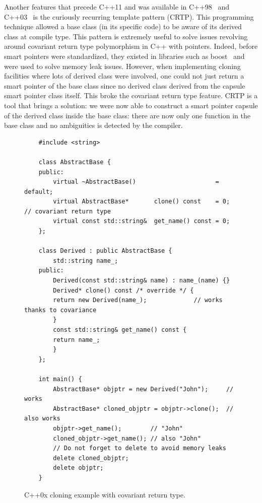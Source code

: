 Another features that precede C++11 and was available in C++98~\parencite{iso.1998.cpp} and
C++03~\parencite{iso.2003.cpp} is the curiously recurring template pattern (CRTP). This programming technique allowed a
base class (in its specific code) to be aware of its derived class at compile type. This pattern is extremely useful to
solve issues revolving around covariant return type polymorphism in C++ with pointers. Indeed, before smart pointers
were standardized, they existed in libraries such as boost~\parencite{boost.2021} and were used to solve memory leak
issues. However, when implementing cloning facilities where lots of derived class were involved, one could not just
return a smart pointer of the base class since no derived class derived from the capsule smart pointer class itself.
This broke the covariant return type feature. CRTP is a tool that brings a solution: we were now able to construct a
smart pointer capsule of the derived class inside the base class: there are now only one function in the base class and
no ambiguities is detected by the compiler.

\begin{figure}[tbh]
  \centering
  \begin{verbatim}
    #include <string>

    class AbstractBase {
    public:
        virtual ~AbstractBase()                      = default;
        virtual AbstractBase*       clone() const    = 0; // covariant return type
        virtual const std::string&  get_name() const = 0;
    };

    class Derived : public AbstractBase {
        std::string name_;
    public:
        Derived(const std::string& name) : name_(name) {}
        Derived* clone() const /* override */ {
        return new Derived(name_);             // works thanks to covariance
        }
        const std::string& get_name() const {
        return name_;
        }
    };

    int main() {
        AbstractBase* objptr = new Derived("John");     // works
        AbstractBase* cloned_objptr = objptr->clone();  // also works
        objptr->get_name();        // "John"
        cloned_objptr->get_name(); // also "John"
        // Do not forget to delete to avoid memory leaks
        delete cloned_objptr;
        delete objptr;
    }
  \end{verbatim}
  \caption{C++0x cloning example with covariant return type.}
  \label{code:gen.crtp.work}
\end{figure}


